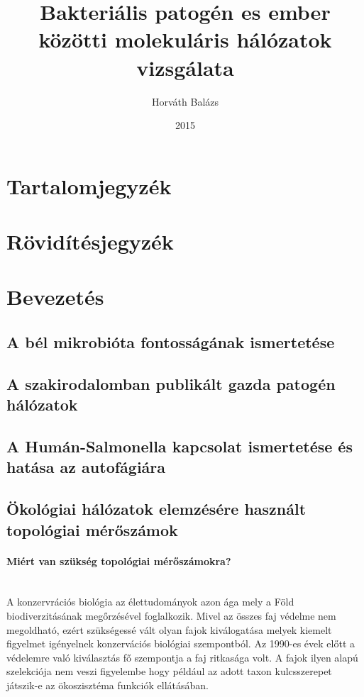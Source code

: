 \documentclass[a4paper,12pt]{article}
\title{Bakteriális patogén es ember közötti molekuláris hálózatok vizsgálata}
\author{Horváth Balázs}
\date{2015}
\begin{document}
\maketitle
\pagebreak

\section{Tartalomjegyzék}
\pagebreak

\section{Rövidítésjegyzék}
\pagebreak

\section{Bevezetés}
	\subsection{A bél mikrobióta fontosságának ismertetése}
	\subsection{A szakirodalomban publikált gazda patogén hálózatok} 
	\subsection{A Humán-Salmonella kapcsolat ismertetése és hatása az 	autofágiára}
	\subsection{Ökológiai hálózatok elemzésére használt topológiai mérőszámok}
	 
	 \paragraph{Miért van szükség topológiai mérőszámokra?} \mbox{}\\ %
	 A konzervrációs biológia az élettudományok azon ága mely a Föld biodiverzitásának megőrzésével foglalkozik. Mivel az összes faj védelme nem megoldható, ezért szükségessé vált olyan fajok kiválogatása melyek kiemelt figyelmet igényelnek konzervációs biológiai szempontból.\cite{new_zeland} Az 1990-es évek előtt a védelemre való kiválasztás fő szempontja a faj ritkasága volt.  A fajok ilyen alapú szelekciója nem veszi figyelembe hogy például az adott taxon kulcsszerepet játszik-e az ökoszisztéma funkciók ellátásában. \cite{jordan_comparison}
	 
\end{document}
